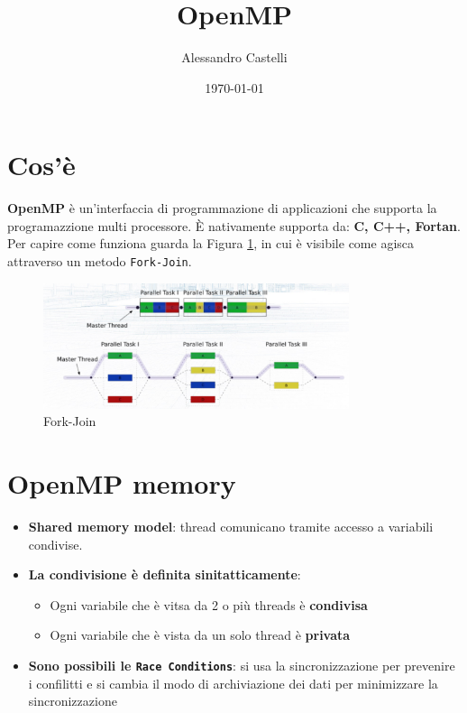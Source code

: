 \documentclass[a4paper, 12pt]{article}
\title{OpenMP}
\author{Alessandro Castelli}
\date{\today}
\begin{document}
\maketitle

\section{Cos'è}
\textbf{OpenMP} è un'interfaccia di programmazione di applicazioni che supporta la programazzione multi processore.
È nativamente supporta da: \textbf{C, C++, Fortan}.
Per capire come funziona guarda la Figura \ref{fig:ForkJoin}, in cui è visibile come agisca attraverso un metodo \texttt{Fork-Join}.

\begin{figure}[h]
    \centering
    \includegraphics[width=0.8\textwidth]{ForkJoin.png}
    \caption{Fork-Join}
    \label{fig:ForkJoin}
\end{figure} 

\section{OpenMP memory }
\begin{itemize}
    \item \textbf{Shared memory model}: thread comunicano tramite accesso a variabili condivise.
    \item \textbf{La condivisione è definita sinitatticamente}: \begin{itemize}
                                                                    \item Ogni variabile che è vitsa da 2 o più threads è \textbf{condivisa}
                                                                    \item Ogni variabile che è vista da un solo thread è \textbf{privata}
                                                                \end{itemize}
    \item \textbf{Sono possibili le \texttt{Race Conditions}}: si usa la sincronizzazione per prevenire i confilitti e si cambia il modo di archiviazione dei dati per minimizzare la sincronizzazione
\end{itemize}
\end{document}
